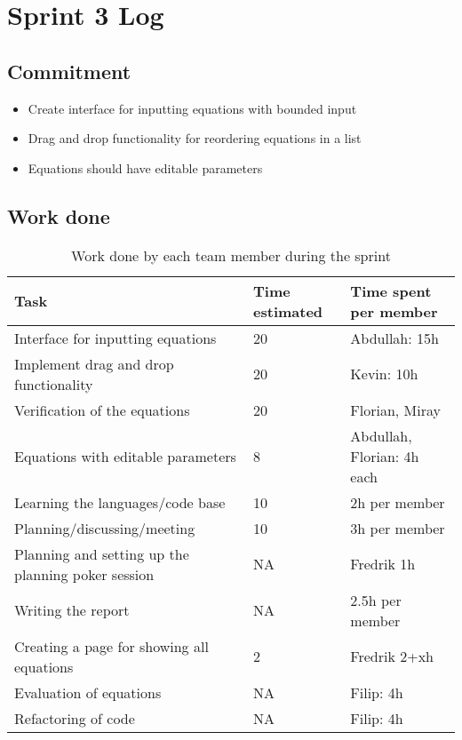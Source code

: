 \documentclass[14]{article}
\begin{document}
\section{Sprint 3 Log}

\subsection{Commitment}

\begin{itemize}
    \item Create interface for inputting equations with bounded input
    \item Drag and drop functionality for reordering equations in a list
    \item Equations should have editable parameters
\end{itemize}

\subsection{Work done}

\begin{table}[H]
    \centering
    \begin{tabular}{|p{}|l|p{}|}
        \hline
        \textbf{Task} & \textbf{Time estimated} & \textbf{Time spent per member}  \\
        \hline
        Interface for inputting equations & 20 & Abdullah: 15h  \\
        \hline
        Implement drag and drop functionality & 20 & Kevin: 10h \\
        \hline
        Verification of the equations & 20 & Florian, Miray \\
        \hline        
        Equations with editable parameters & 8 & Abdullah, Florian: 4h each \\
        \hline        
        Learning the languages/code base & 10 & 2h per member \\
        \hline        
        Planning/discussing/meeting & 10 & 3h per member \\
        \hline        
        Planning and setting up the planning poker session & NA & Fredrik 1h \\
        \hline        
        Writing the report & NA & 2.5h per member \\
        \hline        
        Creating a page for showing all equations & 2 & Fredrik 2+xh \\
        \hline        
        Evaluation of equations & NA & Filip: 4h \\
        \hline        
        Refactoring of code & NA & Filip: 4h \\
        \hline
        
    \end{tabular}
    \caption{Work done by each team member during the sprint}
    \label{tab:my_label}
\end{table}
\end{document}
